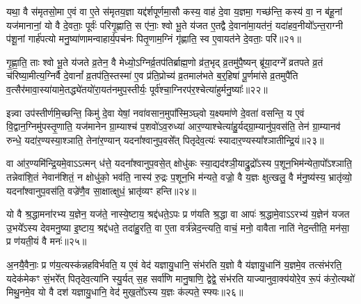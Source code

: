 {\anuvakamend[{द्वि॒ष्मः सु॒वीर्य॒ꣳ॒ स आ पञ्च॑त्रिꣳशच्च॥६॥}]}

यथा॒ वै स॑मृतसो॒मा ए॒वं वा ए॒ते स॑मृतय॒ज्ञा यद्द॑र्\mbox{}शपूर्णमा॒सौ कस्य॒ वाह॑ दे॒वा य॒ज्ञमा॒ गच्छ॑न्ति॒ कस्य॑ वा॒ न ब॑हू॒नां यज॑मानानां॒ यो वै दे॒वताः॒ पूर्वः॑ परिगृ॒ह्णाति॒ स ए॑नाः॒ श्वो भू॒ते य॑जत ए॒तद्वै दे॒वाना॑मा॒यत॑नं॒ यदा॑हव॒नीयो᳚\-ऽन्त॒राग्नी प॑शू॒नां गार्\mbox{}ह॑पत्यो मनु॒ष्या॑णामन्वाहार्य॒पच॑नः पितृ॒णाम॒ग्निं गृ॑ह्णाति॒ स्व ए॒वायत॑ने दे॒वताः॒ परि॑॥२१॥

गृ॒ह्णा॒ति॒ ताः श्वो भू॒ते य॑जते व्र॒तेन॒ वै मेध्यो॒\-ऽग्निर्व्र॒तप॑तिर्ब्राह्म॒णो व्र॑त॒भृद् व्र॒तमु॑पै॒ष्यन् ब्रू॑या॒दग्ने᳚ व्रतपते व्र॒तं च॑रिष्या॒मीत्य॒ग्निर्वै दे॒वानां᳚ व्र॒तप॑ति॒स्तस्मा॑ ए॒व प्र॑ति॒प्रोच्य॑ व्र॒तमाल॑भते ब॒र्॒\mbox{}हिषा॑ पू॒र्णमा॑से व्र॒तमुपै॑ति व॒त्सैर॑मावा॒स्या॑यामे॒तद्ध्ये॑तयो॑रा॒यत॑नमुप॒स्तीर्यः॒ पूर्व॑श्चा॒ग्निरप॑र॒श्चेत्या॑हुर्मनु॒ष्याः᳚॥२२॥

इन्न्वा उप॑स्तीर्णमि॒च्छन्ति॒ किमु॑ दे॒वा येषां॒ नवा॑वसान॒मुपा᳚स्मि॒ञ्छ्वो य॒क्ष्यमा॑णे दे॒वता॑ वसन्ति॒ य ए॒वं वि॒द्वान॒ग्निमु॑पस्तृ॒णाति॒ यज॑मानेन ग्रा॒म्याश्च॑ प॒शवो॑\-ऽव॒रुध्या॑ आर॒ण्याश्चेत्या॑हु॒र्यद्ग्रा॒म्यानु॑प॒वस॑ति॒ तेन॑ ग्रा॒म्यानव॑ रुन्धे॒ यदा॑र॒ण्यस्या॒श्ञाति॒ तेना॑र॒ण्यान् यदना᳚श्वानुप॒वसे᳚त् पितृदेव॒त्यः॑ स्यादार॒ण्यस्या᳚श्ञातीन्द्रि॒यं॥२३॥

वा आ॑र॒ण्यमि॑न्द्रि॒यमे॒वा\-ऽ\-ऽत्मन् ध॑त्ते॒ यदना᳚श्वानुप॒वसे॒त् क्षोधु॑कः स्या॒द्यद॑श्ञी॒याद्रु॒द्रो᳚\-ऽस्य प॒शून॒भिम॑न्येता॒पो᳚\-ऽश्ञाति॒ तन्नेवा॑शि॒तं नेवान॑शितं॒ न क्षोधु॑को॒ भव॑ति॒ नास्य॑ रु॒द्रः प॒शून॒भि म॑न्यते॒ वज्रो॒ वै य॒ज्ञः क्षुत्खलु॒ वै म॑नु॒ष्य॑स्य॒ भ्रातृ॑व्यो॒ यदना᳚श्वानुप॒वस॑ति॒ वज्रे॑णै॒व सा॒क्षात्क्षुधं॒ भ्रातृ॑व्यꣳ हन्ति॥२४॥

{\anuvakamend[{परि॑ मनु॒ष्या॑ इन्द्रि॒यꣳ सा॒क्षात् त्रीणि॑ च॥७॥}]}

यो वै श्र॒द्धामना॑रभ्य य॒ज्ञेन॒ यज॑ते॒ नास्ये॒ष्टाय॒ श्रद्द॑धते॒\-ऽपः प्र ण॑यति श्र॒द्धा वा आपः॑ श्र॒द्धामे॒वा\-ऽ\-ऽरभ्य॑ य॒ज्ञेन॑ यजत उ॒भये᳚\-ऽस्य देवमनु॒ष्या इ॒ष्टाय॒ श्रद्द॑धते॒ तदा॑हु॒रति॒ वा ए॒ता वर्त्र॑न्नेद॒न्त्यति॒ वाचं॒ मनो॒ वावैता नाति॑ नेद॒न्तीति॒ मन॑सा॒ प्र ण॑यती॒यं वै मनः॑॥२५॥

अ॒नयै॒वैनाः॒ प्र ण॑य॒त्यस्क॑न्नहविर्भवति॒ य ए॒वं वेद॑ यज्ञायु॒धानि॒ संभ॑रति य॒ज्ञो वै य॑ज्ञायु॒धानि॑ य॒ज्ञमे॒व तत्संभ॑रति॒ यदेक॑मेकꣳ सं॒भरे᳚त् पितृदेव॒त्या॑नि स्यु॒र्यत् स॒ह सर्वा॑णि मानु॒षाणि॒ द्वेद्वे॒ संभ॑रति याज्यानुवा॒क्य॑योरे॒व रू॒पं क॑रो॒त्यथो॑ मिथु॒नमे॒व यो वै दश॑ यज्ञायु॒धानि॒ वेद॑ मुख॒तो᳚\-ऽस्य य॒ज्ञः क॑ल्पते॒ स्फ्यः॥२६॥

